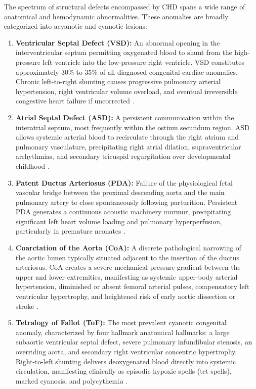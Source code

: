 \documentclass[12pt,a4paper]{amritareport}
\begin{document}
The spectrum of structural defects encompassed by CHD spans a wide range of anatomical and hemodynamic abnormalities. These anomalies are broadly categorized into acyanotic and cyanotic lesions:
\begin{enumerate}
	\item \textbf{Ventricular Septal Defect (VSD):} An abnormal opening in the interventricular septum permitting oxygenated blood to shunt from the high-pressure left ventricle into the low-pressure right ventricle. VSD constitutes approximately 30\% to 35\% of all diagnosed congenital cardiac anomalies. Chronic left-to-right shunting causes progressive pulmonary arterial hypertension, right ventricular volume overload, and eventual irreversible congestive heart failure if uncorrected \cite{minette2006ventricular}.
	\item \textbf{Atrial Septal Defect (ASD):} A persistent communication within the interatrial septum, most frequently within the ostium secundum region. ASD allows systemic arterial blood to recirculate through the right atrium and pulmonary vasculature, precipitating right atrial dilation, supraventricular arrhythmias, and secondary tricuspid regurgitation over developmental childhood \cite{webb2006atrial}.
	\item \textbf{Patent Ductus Arteriosus (PDA):} Failure of the physiological fetal vascular bridge between the proximal descending aorta and the main pulmonary artery to close spontaneously following parturition. Persistent PDA generates a continuous acoustic machinery murmur, precipitating significant left heart volume loading and pulmonary hyperperfusion, particularly in premature neonates \cite{benitz2016patent}.
	\item \textbf{Coarctation of the Aorta (CoA):} A discrete pathological narrowing of the aortic lumen typically situated adjacent to the insertion of the ductus arteriosus. CoA creates a severe mechanical pressure gradient between the upper and lower extremities, manifesting as systemic upper-body arterial hypertension, diminished or absent femoral arterial pulses, compensatory left ventricular hypertrophy, and heightened risk of early aortic dissection or stroke \cite{ward2000coarctation}.
	\item \textbf{Tetralogy of Fallot (ToF):} The most prevalent cyanotic congenital anomaly, characterized by four hallmark anatomical hallmarks: a large subaortic ventricular septal defect, severe pulmonary infundibular stenosis, an overriding aorta, and secondary right ventricular concentric hypertrophy. Right-to-left shunting delivers deoxygenated blood directly into systemic circulation, manifesting clinically as episodic hypoxic spells (tet spells), marked cyanosis, and polycythemia \cite{bailliard2009tetralogy}.
\end{enumerate}
\end{document}
